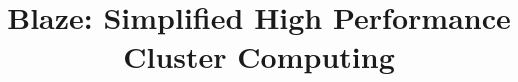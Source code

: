 \documentclass{sigkddExp}
\begin{document}
%

\title{Blaze: Simplified High Performance Cluster Computing}
%

%

\end{document}
